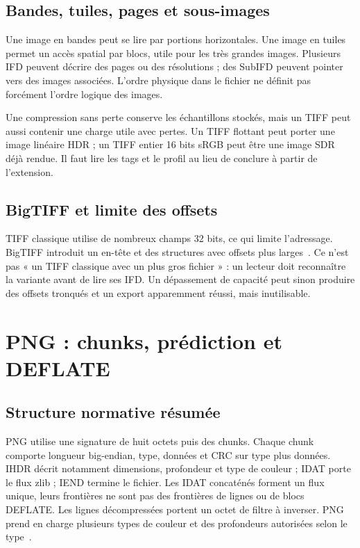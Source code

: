 \subsection{Bandes, tuiles, pages et sous-images}
Une image en bandes peut se lire par portions horizontales.
Une image en tuiles permet un accès spatial par blocs, utile
pour les très grandes images. Plusieurs IFD peuvent décrire
des pages ou des résolutions ; des SubIFD peuvent pointer vers
des images associées. L'ordre physique dans le fichier ne
définit pas forcément l'ordre logique des images.

Une compression sans perte conserve les échantillons stockés,
mais un TIFF peut aussi contenir une charge utile avec pertes.
Un TIFF flottant peut porter une image linéaire HDR ; un TIFF
entier 16 bits sRGB peut être une image SDR déjà rendue. Il
faut lire les tags et le profil au lieu de conclure à partir
de l'extension.

\subsection{BigTIFF et limite des offsets}
TIFF classique utilise de nombreux champs 32 bits, ce qui
limite l'adressage. BigTIFF introduit un en-tête et des
structures avec offsets plus larges~\cite{bigtiff}. Ce n'est
pas « un TIFF classique avec un plus gros fichier » : un
lecteur doit reconnaître la variante avant de lire ses IFD.
Un dépassement de capacité peut sinon produire des offsets
tronqués et un export apparemment réussi, mais inutilisable.

\section{PNG : chunks, prédiction et DEFLATE}
\subsection{Structure normative résumée}
PNG utilise une signature de huit octets puis des chunks.
Chaque chunk comporte longueur big-endian, type, données et
CRC sur type plus données. IHDR décrit notamment dimensions,
profondeur et type de couleur ; IDAT porte le flux zlib ; IEND
termine le fichier. Les IDAT concaténés forment un flux unique,
leurs frontières ne sont pas des frontières de lignes ou de
blocs DEFLATE. Les lignes décompressées portent un octet de
filtre à inverser. PNG prend en charge plusieurs types de
couleur et des profondeurs autorisées selon le type~\cite{png}.

